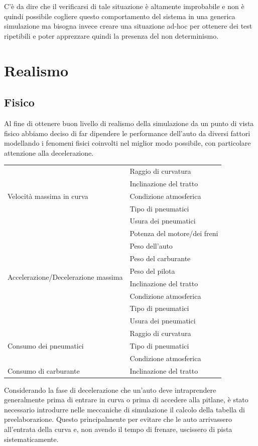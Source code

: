 \documentclass[11pt,a4paper]{report}
\begin{document}
C'è da dire che il verificarsi di tale situazione è altamente improbabile e non è quindi possibile cogliere questo comportamento del sistema in una generica simulazione ma bisogna invece creare una situazione ad-hoc per ottenere dei test ripetibili e poter apprezzare quindi la presenza del non determinismo.

\section{Realismo}
\subsection*{Fisico}
Al fine di ottenere buon livello di realismo della simulazione da un punto di vista fisico abbiamo deciso di far dipendere le performance dell'auto da diversi fattori modellando i fenomeni fisici coinvolti nel miglior modo possibile, con particolare attenzione alla decelerazione.

\begin{center}
\begin{tabular}{|l|l|}
\hline
\multirow{5}{*}{Velocità massima in curva} & Raggio di curvatura\\
& Inclinazione del tratto\\
& Condizione atmosferica\\
& Tipo di pneumatici\\
& Usura dei pneumatici\\
\hline
\multirow{8}{*}{Accelerazione/Decelerazione massima} & Potenza del motore/dei freni\\
& Peso dell'auto\\
& Peso del carburante\\
& Peso del pilota\\
& Inclinazione del tratto\\
& Condizione atmosferica\\
& Tipo di pneumatici\\
& Usura dei pneumatici\\
\hline
\multirow{3}{*}{Consumo dei pneumatici} & Raggio di curvatura\\
& Tipo di pneumatici\\
& Condizione atmosferica\\
\hline
Consumo di carburante & Inclinazione del tratto\\
\hline
\end{tabular}
\end{center}

Considerando la fase di decelerazione che un'auto deve intraprendere generalmente prima di entrare in curva o prima di accedere alla pitlane, è stato necessario introdurre nelle meccaniche di simulazione il calcolo della tabella di preelaborazione.
Questo principalmente per evitare che le auto arrivassero all'entrata della curva e, non avendo il tempo di frenare, uscissero di pista sistematicamente.
\end{document}
